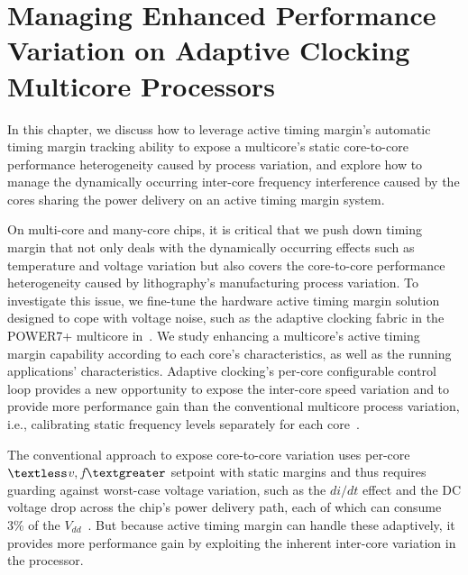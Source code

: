 
\chapter{Managing Enhanced Performance Variation on Adaptive Clocking Multicore Processors}
\label{sec:process}

In this chapter, we discuss how to leverage active timing margin's automatic timing margin tracking ability to expose a multicore's static core-to-core performance heterogeneity caused by process variation, and explore how to manage the dynamically occurring inter-core frequency interference caused by the cores sharing the power delivery on an active timing margin system.

On multi-core and many-core chips, it is critical that we push down timing margin that not only deals with the dynamically occurring effects such as temperature and voltage variation but also covers the core-to-core performance heterogeneity caused by lithography's manufacturing process variation. To investigate this issue, we fine-tune the hardware active timing margin solution designed to cope with voltage noise, such as the adaptive clocking fabric in the POWER7+ multicore in~. We study enhancing a multicore's active timing margin capability according to each core's characteristics, as well as the running applications' characteristics. Adaptive clocking's per-core configurable control loop provides a new opportunity to expose the inter-core speed variation and to provide more performance gain than the conventional multicore process variation, i.e., calibrating static frequency levels separately for each core~\cite{sarangi2008varius,teodorescu2008variation,rangan2009thread,dighe2010within,rangan2011achieving}.

The conventional approach to expose core-to-core variation uses per-core $\textless$$v,f$$\textgreater$ setpoint with static margins and thus requires guarding against worst-case voltage variation, such as the $di/dt$ effect and the DC voltage drop across the chip's power delivery path, each of which can consume 3\% of the $V_{dd}$~\cite{zu2015adaptive}. But because active timing margin can handle these adaptively, it provides more performance gain by exploiting the inherent inter-core variation in the processor.

